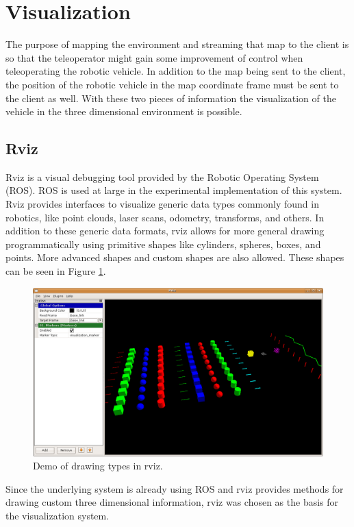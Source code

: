 \documentclass[12pt]{report}
\begin{document}
\section{Visualization}
The purpose of mapping the environment and streaming that map to the client is so that the teleoperator might gain some improvement of control when teleoperating the robotic vehicle.  In addition to the map being sent to the client, the position of the robotic vehicle in the map coordinate frame must be sent to the client as well.  With these two pieces of information the visualization of the vehicle in the three dimensional environment is possible.

\subsection{Rviz}
Rviz\cite{rviz} is a visual debugging tool provided by the Robotic Operating System (ROS)\cite{quigley2009ros}.  ROS is used at large in the experimental implementation of this system.  Rviz provides interfaces to visualize generic data types commonly found in robotics, like point clouds, laser scans, odometry, transforms, and others.  In addition to these generic data formats, rviz allows for more general drawing programmatically using primitive shapes like cylinders, spheres, boxes, and points.  More advanced shapes and custom shapes are also allowed.  These shapes can be seen in Figure \ref{fig:rviz_shapes}.

\begin{figure}[ht]
  \centering
  \includegraphics[width=6in,keepaspectratio]{rviz_shapes.png}
  \caption{Demo of drawing types in rviz\cite{rviz_shapes}.}
  \label{fig:rviz_shapes}
\end{figure}

Since the underlying system is already using ROS and rviz provides methods for drawing custom three dimensional information, rviz was chosen as the basis for the visualization system.
\end{document}
